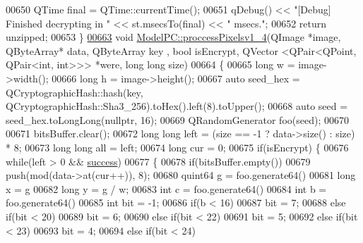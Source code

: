 \begin{DoxyCode}
00650     QTime \textcolor{keyword}{final} = QTime::currentTime();
00651     qDebug() << \textcolor{stringliteral}{"[Debug] Finished decrypting in "} << st.msecsTo(\textcolor{keyword}{final}) << \textcolor{stringliteral}{" msecs."};
00652     \textcolor{keywordflow}{return} unzipped;
00653 \}
\hypertarget{modelpc_8cpp_source.tex_l00663}{}\hyperlink{class_model_p_c_a5cdb4d1d61ff62ee9d45b496a7dbf1fb}{00663} \textcolor{keywordtype}{void} \hyperlink{class_model_p_c_a5cdb4d1d61ff62ee9d45b496a7dbf1fb}{ModelPC::proccessPixelsv1\_4}(QImage *image, QByteArray* data, QByteArray key
      , \textcolor{keywordtype}{bool} isEncrypt, QVector <QPair<QPoint, QPair<int, int>>> *were, \textcolor{keywordtype}{long} \textcolor{keywordtype}{long} size)
00664 \{
00665     \textcolor{keywordtype}{long} w = image->width();
00666     \textcolor{keywordtype}{long} h = image->height();
00667     \textcolor{keyword}{auto} seed\_hex = QCryptographicHash::hash(key, QCryptographicHash::Sha3\_256).toHex().left(8).toUpper();
00668     \textcolor{keyword}{auto} seed = seed\_hex.toLongLong(\textcolor{keyword}{nullptr}, 16);
00669     QRandomGenerator foo(seed);
00670 
00671     bitsBuffer.clear();
00672     \textcolor{keywordtype}{long} \textcolor{keywordtype}{long} left = (size == -1 ? data->size() : size) * 8;
00673     \textcolor{keywordtype}{long} \textcolor{keywordtype}{long} all = left;
00674     \textcolor{keywordtype}{long} cur = 0;
00675     \textcolor{keywordflow}{if}(isEncrypt) \{
00676         \textcolor{keywordflow}{while}(left > 0 && \hyperlink{class_model_p_c_a945ffbbc44a832b953c191debd448f4c}{success})
00677         \{
00678             \textcolor{keywordflow}{if}(bitsBuffer.empty())
00679                 push(mod(data->at(cur++)), 8);
00680             quint64 g = foo.generate64() %
00681             \textcolor{keywordtype}{long} x = g %
00682             \textcolor{keywordtype}{long} y = g / w;
00683             \textcolor{keywordtype}{int} c = foo.generate64() %
00684             \textcolor{keywordtype}{int} b = foo.generate64() %
00685             \textcolor{keywordtype}{int} bit = -1;
00686             \textcolor{keywordflow}{if}(b < 16)
00687                 bit = 7;
00688             \textcolor{keywordflow}{else} \textcolor{keywordflow}{if}(bit < 20)
00689                 bit = 6;
00690             \textcolor{keywordflow}{else} \textcolor{keywordflow}{if}(bit < 22)
00691                 bit = 5;
00692             \textcolor{keywordflow}{else} \textcolor{keywordflow}{if}(bit < 23)
00693                 bit = 4;
00694             \textcolor{keywordflow}{else} \textcolor{keywordflow}{if}(bit < 24)

\end{DoxyCode}
